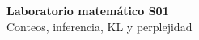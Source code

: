 \documentclass[11pt,a4paper]{report}
\begin{document}
\begin{center}{\LARGE\bfseries Laboratorio matemático S01}\\
Conteos, inferencia, KL y perplejidad\end{center}
\tableofcontents\clearpage

\end{document}
